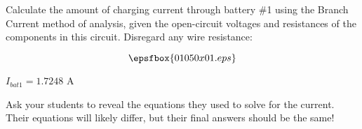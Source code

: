 

Calculate the amount of charging current through battery \#1 using the Branch Current method of analysis, given the open-circuit voltages and resistances of the components in this circuit.  Disregard any wire resistance:

$$\epsfbox{01050x01.eps}$$







$I_{bat1} = 1.7248$ A







Ask your students to reveal the equations they used to solve for the current.  Their equations will likely differ, but their final answers should be the same!



